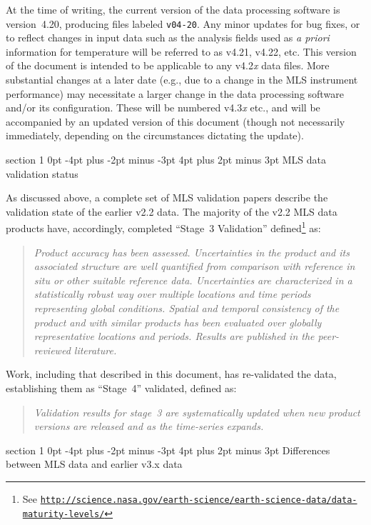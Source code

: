 \documentclass[11pt,draft]{report}
\makeatletter
\renewcommand{\section}{\@startsection%
  {section}%
  {1}%
  {0pt}%
  {-4pt plus -2pt minus -3pt}%
  {4pt plus 2pt minus 3pt}%
  {\Large\sffamily\fontseries{sb}\selectfont\flushleft\color{SectionColor}\figureversion{tabular}}}%
\makeatother
\begin{document}
At the time of writing, the current version of the data processing
software is version~4.20, producing files labeled \texttt{v04-20}.  Any
minor updates for bug fixes, or to reflect changes in input data such as
the analysis fields used as \emph{a priori} information for temperature
will be referred to as v4.21, v4.22, etc.  This version of the document
is intended to be applicable to any v4.2\emph{x} data files.  More
substantial changes at a later date (e.g., due to a change in the MLS
instrument performance) may necessitate a larger change in the data
processing software and/or its configuration.  These will be numbered
v4.3\emph{x} etc., and will be accompanied by an updated version of this
document (though not necessarily immediately, depending on the
circumstances dictating the update).

\section{MLS data validation status}

As discussed above, a complete set of MLS validation papers describe the
validation state of the earlier v2.2 data.  The majority of the v2.2 MLS
data products have, accordingly, completed ``Stage~3 Validation''
defined\footnote{See
  \href{http://science.nasa.gov/earth-science/earth-science-data/data-maturity-levels/}%
  {\texttt{http://science.nasa.gov/earth-science/earth-science-data/data-maturity-levels/}}}
as:
\begin{quote}\itshape
  Product accuracy has been assessed.  Uncertainties in the product and
  its associated structure are well quantified from comparison with
  reference in situ or other suitable reference data. Uncertainties are
  characterized in a statistically robust way over multiple locations
  and time periods representing global conditions.  Spatial and temporal
  consistency of the product and with similar products has been
  evaluated over globally representative locations and periods.  Results
  are published in the peer-reviewed literature.
\end{quote}
Work, including that described in this document, has re-validated the
\thisv data, establishing them as ``Stage~4'' validated, defined as:
\begin{quote}\itshape
  Validation results for stage~3 are systematically updated when new
  product versions are released and as the time-series expands.
\end{quote}

\section{Differences between MLS \thisv data and earlier v3.x data}
\label{sec:V4vsV3Overview}
\end{document}
